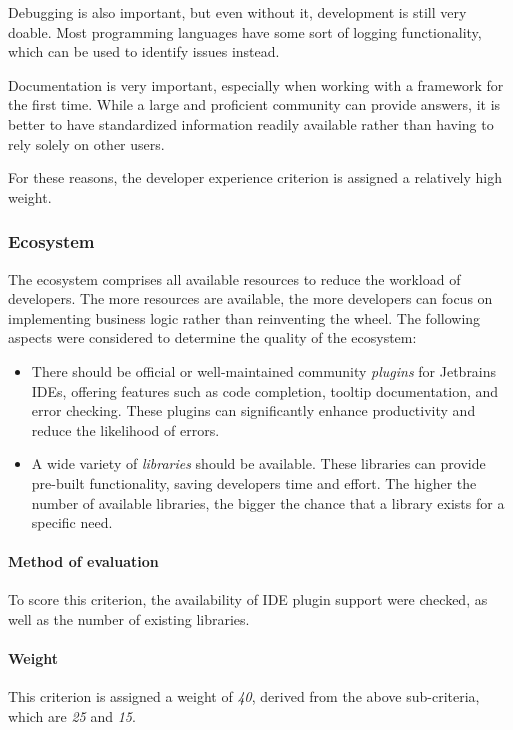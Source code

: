 Debugging is also important, but even without it, development is still very doable.
Most programming languages have some sort of logging functionality, which can be used to identify issues instead.

Documentation is very important, especially when working with a framework for the first time.
While a large and proficient community can provide answers, it is better to have standardized information readily available rather than having to rely solely on other users.

For these reasons, the developer experience criterion is assigned a relatively high weight.

\subsubsection{Ecosystem}\label{subsubsec:ecosystem}
The ecosystem comprises all available resources to reduce the workload of developers.
The more resources are available, the more developers can focus on implementing business logic rather than reinventing the wheel.
The following aspects were considered to determine the quality of the ecosystem:

\begin{itemize}
	\item There should be official or well-maintained community \emph{plugins} for Jetbrains IDEs, offering features such as code completion, tooltip documentation, and error checking.
	      These plugins can significantly enhance productivity and reduce the likelihood of errors.
	\item A wide variety of \emph{libraries} should be available.
	      These libraries can provide pre-built functionality, saving developers time and effort.
	      The higher the number of available libraries, the bigger the chance that a library exists for a specific need.
\end{itemize}

\paragraph{Method of evaluation}
To score this criterion, the availability of IDE plugin support were checked, as well as the number of existing libraries.

\paragraph{Weight}
This criterion is assigned a weight of \emph{40}, derived from the above sub-criteria, which are \emph{25} and \emph{15}.

